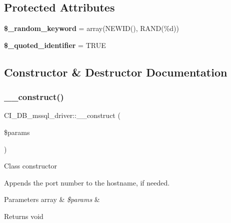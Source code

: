 \subsection*{Protected Attributes}
\begin{DoxyCompactItemize}
\item 
\mbox{\label{class_c_i___d_b__mssql__driver_afb3ba51719ce2c8cf46745325b28830c}} 
{\bfseries \$\+\_\+random\+\_\+keyword} = array(\textquotesingle{}N\+E\+W\+ID()\textquotesingle{}, \textquotesingle{}R\+A\+ND(\%d)\textquotesingle{})
\item 
\mbox{\label{class_c_i___d_b__mssql__driver_a32d39b4113bd50dae04581df08abdbe4}} 
{\bfseries \$\+\_\+quoted\+\_\+identifier} = T\+R\+UE
\end{DoxyCompactItemize}


\subsection{Constructor \& Destructor Documentation}
\mbox{\label{class_c_i___d_b__mssql__driver_a68e1cf7f7648858a9a59f05082ca402f}} 
\subsubsection{\texorpdfstring{\+\_\+\+\_\+construct()}{\_\_construct()}}
{\footnotesize\ttfamily C\+I\+\_\+\+D\+B\+\_\+mssql\+\_\+driver\+::\+\_\+\+\_\+construct (\begin{DoxyParamCaption}\item[{}]{\$params }\end{DoxyParamCaption})}

Class constructor

Appends the port number to the hostname, if needed.


\begin{DoxyParams}[1]{Parameters}
array & {\em \$params} & \\
\hline
\end{DoxyParams}
\begin{DoxyReturn}{Returns}
void 
\end{DoxyReturn}


